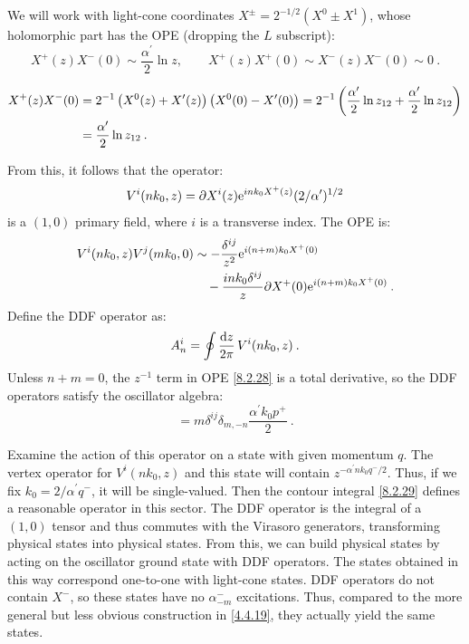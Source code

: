 We will work with light-cone coordinates $X^{\pm}=2^{-1 / 2}(X^{0} \pm X^{1})$, whose holomorphic part has the OPE (dropping the $L$ subscript):
\begin{equation}
	X^{+}(z) X^{-}(0) \sim \frac{\alpha^{\prime}}{2} \ln z, \qquad X^{+}(z) X^{+}(0) \sim X^{-}(z) X^{-}(0) \sim 0 \:. \label{8.2.26}
\end{equation}
\begin{tcolorbox}
	\begin{remark}
		\begin{align}
			X^{+}(z) X^{-}(0) &= 2^{-1}\left(X^{0}(z)+X^{\prime}(z)\right)\left(X^{0}(0)-X^{\prime}(0)\right) 
			= 2^{-1}\left(\frac{\alpha^{\prime}}{2} \ln z_{12}+\frac{\alpha^{\prime}}{2}\ln z_{12}\right)\notag\\
			&=\frac{\alpha^{\prime}}{2} \ln z_{12} \:. \label{8.2.27}
		\end{align}
	\end{remark}
\end{tcolorbox}
\noindent From this, it follows that the operator:
\begin{equation}
	V^{i}(n k_{0}, z)=\partial X^{i}(z) \mathrm{e}^{i n k_{0} X^{+}(z)}(2 / \alpha^{\prime})^{1 / 2} \label{8.2.28}
\end{equation}
is a $(1,0)$ primary field, where $i$ is a transverse index.
The OPE is:
\begin{align}
	V^{i}(n k_{0}, z) V^{j}(m k_{0}, 0) &\sim-\frac{\delta^{i j}}{z^{2}} \mathrm{e}^{i(n+m) k_{0} X^{+}(0)}  \nonumber \\
	&\quad -\frac{i n k_{0} \delta^{i j}}{z} \partial X^{+}(0) \mathrm{e}^{i(n+m) k_{0} X^{+}(0)} \:. \label{8.2.29}
\end{align}
Define the DDF operator as:
\begin{equation}
	A_{n}^{i}=\oint \frac{\mathrm{d} z}{2 \pi} \, V^{i}(n k_{0}, z) \:. \label{8.2.30}
\end{equation}
Unless $n+m=0$, the $z^{-1}$ term in OPE \eqref{8.2.28} is a total derivative, so the DDF operators satisfy the oscillator algebra:
\begin{equation}
	[A_{m}^{i}, A_{n}^{j}]=m \delta^{i j} \delta_{m,-n} \frac{\alpha^{\prime} k_{0} p^{+}}{2} \:. \label{8.2.31}
\end{equation}

Examine the action of this operator on a state with given momentum $q$. The vertex operator for $V^{i}(n k_{0}, z)$ and this state will contain $z^{-\alpha^{\prime} n k_{0} q^{-} / 2}$. 
Thus, if we fix $k_{0}=2 / \alpha^{\prime} q^{-}$, it will be single-valued. Then the contour integral \eqref{8.2.29} defines a reasonable operator in this sector.
The DDF operator is the integral of a $(1,0)$ tensor and thus commutes with the Virasoro generators, transforming physical states into physical states. From this, we can build physical states by acting on the oscillator ground state with DDF operators. 
The states obtained in this way correspond one-to-one with light-cone states. DDF operators do not contain $X^{-}$, so these states have no $\alpha_{-m}^{-}$ excitations. 
Thus, compared to the more general but less obvious construction in \eqref{4.4.19}, they actually yield the same states.

